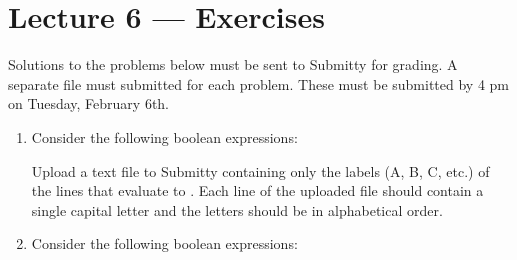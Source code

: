 \documentclass[letterpaper,10pt,english]{sphinxmanual}
\begin{document}
\chapter{Lecture 6 — Exercises}
\label{\detokenize{lecture_notes/lec06_conditionals1_exercises/exercises:lecture-6-exercises}}\label{\detokenize{lecture_notes/lec06_conditionals1_exercises/exercises::doc}}
Solutions to the problems below must be sent to Submitty for grading.
A separate file must submitted for each problem.  These must be
submitted by 4 pm on Tuesday, February 6th.
\begin{enumerate}
\item {} 
Consider the following boolean expressions:

%
\begin{sphinxVerbatim}[commandchars=\\\{\}]
  
  
  
  
  
  
  
  
  

               
          
              
               
              
              
               
\end{sphinxVerbatim}

Upload a text file to Submitty containing only the labels (A, B, C,
etc.) of the lines that evaluate to .  Each line of the
uploaded file should contain a single capital letter and the
letters should be in alphabetical order.

\item {} 
Consider the following boolean expressions:


\end{enumerate}
\end{document}
